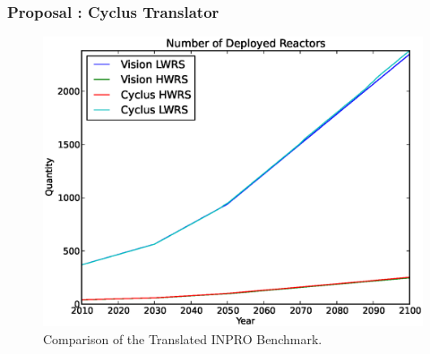 \begin{frame}
  \frametitle{Proposal : Cyclus Translator}
  \begin{figure}[t]
    \includegraphics[width=\linewidth, height=.75\textheight, keepaspectratio]{rxtrs.eps}
    \caption{Comparison of the Translated INPRO Benchmark.}
  \end{figure}
\end{frame}

